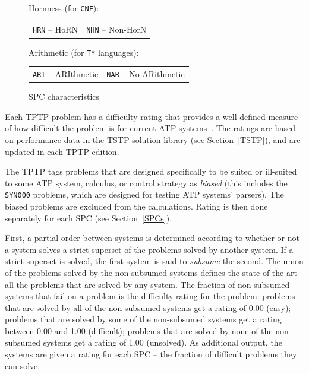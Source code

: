 \documentclass[runningheads]{llncs}
\newenvironment{packed_itemize}{
\vspace*{-0.2em}
\begin{itemize}
\setlength{\partopsep}{0pt}
\setlength{\itemsep}{1pt}
\setlength{\parskip}{0pt}
\setlength{\parsep}{0pt}
}{\end{itemize}}
\begin{document}
\begin{figure}[bht]
\begin{packed_itemize}
\item Hornness (for {\tt CNF}): \\
      \begin{tabular}{@{}p{5cm}l}
      {\tt HRN} -- HoRN &
      {\tt NHN} -- Non-HorN
      \end{tabular}
\item Arithmetic (for {\tt T*} languages): \\
      \begin{tabular}{@{}p{5cm}l}
      {\tt ARI} -- ARIthmetic &
      {\tt NAR} -- No ARithmetic
      \end{tabular}
\end{packed_itemize}
\caption{SPC characteristics}
\label{SPCCharacteristics}
\end{figure} 

Each TPTP problem has a difficulty rating that provides a well-defined measure of how difficult 
the problem is for current ATP systems~\cite{SS01}.
The ratings are based on performance data in the TSTP solution library (see Section~\ref{TSTP}), 
and are updated in each TPTP edition.

The TPTP tags problems that are designed specifically to be suited or ill-suited to some ATP
system, calculus, or control strategy as {\em biased}
(this includes the {\tt SYN000} problems, which are designed for testing ATP systems' parsers).
The biased problems are excluded from the calculations.
Rating is then done separately for each SPC (see Section~\ref{SPCs}).

First, a partial order between systems is determined according to whether or not a system 
solves a strict superset of the problems solved by another system. 
If a strict superset is solved, the first system is said to {\em subsume} the second. 
The union of the problems solved by the non-subsumed systems defines the state-of-the-art -- all 
the problems that are solved by any system. 
The fraction of non-subsumed systems that fail on a problem is the difficulty rating 
for the problem:
problems that are solved by all of the non-subsumed systems get a rating of 0.00 (easy);
problems that are solved by some of the non-subsumed systems get a rating between 0.00 and 1.00 
(difficult); 
problems that are solved by none of the non-subsumed systems get a rating of 1.00 (unsolved).
As additional output, the systems are given a rating for each SPC -- the fraction of difficult 
problems they can solve.
\end{document}
